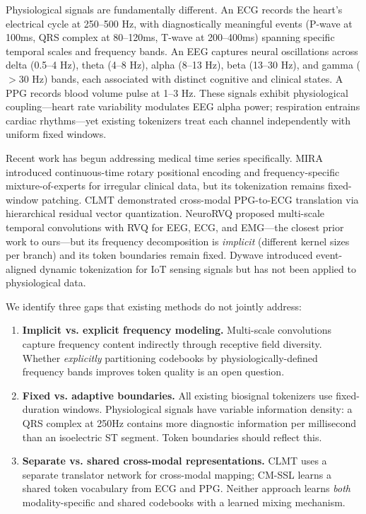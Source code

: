 \documentclass[letterpaper]{article}
\begin{document}
Physiological signals are fundamentally different. An ECG records the heart's
electrical cycle at 250--500 Hz, with diagnostically meaningful events
(P-wave at 100ms, QRS complex at 80--120ms, T-wave at 200--400ms) spanning
specific temporal scales and frequency bands. An EEG captures neural oscillations
across delta (0.5--4 Hz), theta (4--8 Hz), alpha (8--13 Hz), beta (13--30 Hz),
and gamma ($>$30 Hz) bands, each associated with distinct cognitive and clinical
states. A PPG records blood volume pulse at 1--3 Hz. These signals exhibit
physiological coupling---heart rate variability modulates EEG alpha power;
respiration entrains cardiac rhythms---yet existing tokenizers treat each
channel independently with uniform fixed windows.

Recent work has begun addressing medical time series specifically. MIRA
\cite{mira2025} introduced continuous-time rotary positional encoding and
frequency-specific mixture-of-experts for irregular clinical data, but its
tokenization remains fixed-window patching. CLMT \cite{cui2026clmt} demonstrated
cross-modal PPG-to-ECG translation via hierarchical residual vector quantization.
NeuroRVQ \cite{barmpas2025neurorvq} proposed multi-scale temporal convolutions
with RVQ for EEG, ECG, and EMG---the closest prior work to ours---but its
frequency decomposition is \textit{implicit} (different kernel sizes per branch)
and its token boundaries remain fixed. Dywave \cite{dywave2026} introduced
event-aligned dynamic tokenization for IoT sensing signals but has not been
applied to physiological data.

We identify three gaps that existing methods do not jointly address:

\begin{enumerate}
    \item \textbf{Implicit vs. explicit frequency modeling.} Multi-scale
    convolutions \cite{barmpas2025neurorvq} capture frequency content indirectly
    through receptive field diversity. Whether \textit{explicitly} partitioning
    codebooks by physiologically-defined frequency bands improves token quality
    is an open question.

    \item \textbf{Fixed vs. adaptive boundaries.} All existing biosignal
    tokenizers use fixed-duration windows. Physiological signals have variable
    information density: a QRS complex at 250Hz contains more diagnostic
    information per millisecond than an isoelectric ST segment. Token
    boundaries should reflect this.

    \item \textbf{Separate vs. shared cross-modal representations.} CLMT
    \cite{cui2026clmt} uses a separate translator network for cross-modal
    mapping; CM-SSL \cite{cmssl2026} learns a shared token vocabulary from
    ECG and PPG. Neither approach learns \textit{both} modality-specific
    and shared codebooks with a learned mixing mechanism.
\end{enumerate}
\end{document}
